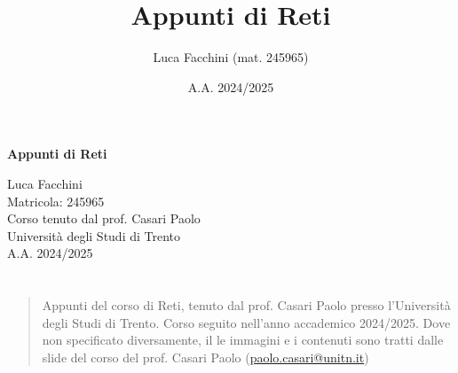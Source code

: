 \documentclass[twoside]{report}
\title{Appunti di Reti}
\author{Luca Facchini (mat. 245965)}
\date{A.A. 2024/2025}
\makeatletter
\renewenvironment{abstract}{%
    \if@twocolumn
        \section*{\abstractname}%
    \else
        \begin{center}%
            {\bfseries \abstractname\vspace{-.5em}\vspace{\z@}}%
        \end{center}%
        \small
        \begin{quotation}
    \fi}
    {\if@twocolumn\else\end{quotation}\fi}
\makeatother
\begin{document}
    \begin{titlepage}
        \centering  %
        {\Huge\textbf{Appunti di Reti}} \\[1cm] %
        \vspace{0.5cm}
        
        {\Large Luca Facchini} \\ %
        \vspace{0.3cm}
        {\large Matricola: 245965} \\[2cm] %
        
        {\large Corso tenuto dal prof. Casari Paolo} \\[0.3cm] %
        {\large Università degli Studi di Trento} \\[1.5cm]
        
        {\large A.A. 2024/2025} \\[3cm] %
        
        \vfill
        \begin{abstract}
            Appunti del corso di Reti, tenuto dal prof. Casari Paolo presso l'Università degli Studi di Trento. Corso seguito nell'anno accademico 2024/2025.\newline
            Dove non specificato diversamente, il le immagini e i contenuti sono tratti dalle slide del corso del prof. Casari Paolo (\hyperlink{mailto:paolo.casari@unitn.it}{paolo.casari@unitn.it})
        \end{abstract}
        
        \vfill  %
    \end{titlepage}
    \begingroup
        \pagestyle{tocStyle}
        \tableofcontents
    \endgroup
    \pagestyle{stdPage}
    
    
    
    
\end{document}
